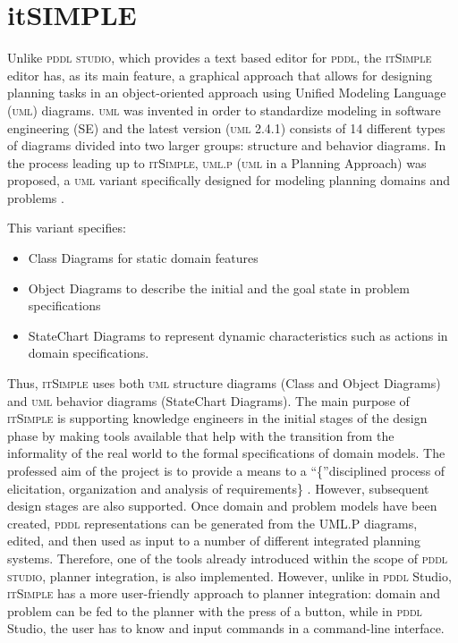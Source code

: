 \documentclass[a4paper,12pt]{report}
\newcommand{\pddlstudio}{\textsc{pddl studio}\xspace}
\newcommand{\itsimple}{\textsc{itSimple}\xspace}
\newcommand{\pddl}{\textsc{pddl}\xspace}
\begin{document}
\section{itSIMPLE}
\label{sec-3-2}

Unlike \pddlstudio, which provides a text based editor for \pddl, the
\itsimple \cite{vaquero2005itsimple} editor has, as its main feature, a
graphical approach that allows for designing planning tasks in an
object-oriented approach using Unified Modeling Language (\textsc{uml})
\cite{booch1999unified} diagrams. \textsc{uml} was invented in order
to standardize modeling in software engineering (SE) and the latest
version (\textsc{uml} 2.4.1) \cite{umllatest} consists of 14 different types of diagrams
divided into two larger groups: structure and behavior diagrams. In
the process leading up to \itsimple, \textsc{uml.p} (\textsc{uml} in a
Planning Approach) was proposed, a \textsc{uml} variant specifically
designed for modeling planning domains and problems
\cite{vaquero2006use}.

This variant specifies:

\begin{itemize}
\item Class Diagrams for static domain features
\item Object Diagrams to describe the initial and the goal state in
problem specifications
\item StateChart Diagrams to represent dynamic characteristics such as
actions in domain specifications.
\end{itemize}

Thus, \itsimple uses both \textsc{uml} structure diagrams (Class and
Object Diagrams) and \textsc{uml} behavior diagrams (StateChart
Diagrams). The main purpose of \itsimple is supporting knowledge
engineers in the initial stages of the design phase by making tools
available that help with the transition from the informality of the
real world to the formal specifications of domain models. The
professed aim of the project is to provide a means to a
\enquote\{disciplined process of elicitation, organization and analysis
of requirements\} \cite{vaquero2005itsimple}. However, subsequent
design stages are also supported. Once domain and problem models have
been created, \textsc{pddl} representations can be generated from the
UML.P diagrams, edited, and then used as input to a number of
different integrated planning systems. Therefore, one of the tools
already introduced within the scope of \pddlstudio, planner
integration, is also implemented. However, unlike in \textsc{pddl}
Studio, \itsimple has a more user-friendly approach to planner
integration: domain and problem can be fed to the planner with the
press of a button, while in \textsc{pddl} Studio, the user has to know
and input commands in a command-line interface.
\end{document}
